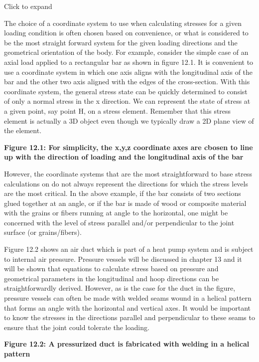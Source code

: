 \documentclass[
  letterpaper,
  DIV=11,
  numbers=noendperiod]{scrreprt}
\begin{document}
Click to expand

The choice of a coordinate system to use when calculating stresses for a
given loading condition is often chosen based on convenience, or what is
considered to be the most straight forward system for the given loading
directions and the geometrical orientation of the body. For example,
consider the simple case of an axial load applied to a rectangular bar
as shown in figure 12.1. It is convenient to use a coordinate system in
which one axis aligns with the longitudinal axis of the bar and the
other two axis aligned with the edges of the cross-section. With this
coordinate system, the general stress state can be quickly determined to
consist of only a normal stress in the x direction. We can represent the
state of stress at a given point, say point H, on a stress element.
Remember that this stress element is actually a 3D object even though we
typically draw a 2D plane view of the element.

\textbf{Figure 12.1: For simplicity, the x,y,z coordinate axes are
cbosen to line up with the direction of loading and the longitudinal
axis of the bar}

However, the coordinate systems that are the most straightforward to
base stress calculations on do not always represent the directions for
which the stress levels are the most critical. In the above example, if
the bar consists of two sections glued together at an angle, or if the
bar is made of wood or composite material with the grains or fibers
running at angle to the horizontal, one might be concerned with the
level of stress parallel and/or perpendicular to the joint surface (or
grains/fibers).

Figure 12.2 shows an air duct which is part of a heat pump system and is
subject to internal air pressure. Pressure vessels will be discussed in
chapter 13 and it will be shown that equations to calculate stress based
on pressure and geometrical parameters in the longitudinal and hoop
directions can be straightforwardly derived. However, as is the case for
the duct in the figure, pressure vessels can often be made with welded
seams wound in a helical pattern that forms an angle with the horizontal
and vertical axes. It would be important to know the stresses in the
directions parallel and perpendicular to these seams to ensure that the
joint could tolerate the loading.

\textbf{Figure 12.2: A pressurized duct is fabricated with welding in a
helical pattern}
\end{document}

